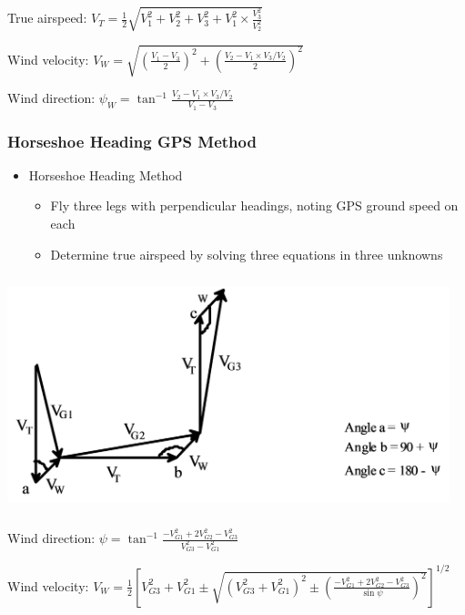 \documentclass[
]{book}
\providecommand{\tightlist}{%
  \setlength{\itemsep}{0pt}\setlength{\parskip}{0pt}}
\begin{document}
True airspeed: \(V_T = \frac{1}{2} \sqrt{V_1^2 + V_2^2 + V_3^2 + V_1^2 \times \frac{V_3^2}{V_2^2}}\)

Wind velocity: \(V_W = \sqrt{\left( \frac{V_1 - V_3}{2} \right)^2 + \left( \frac{V_2 - V_1 \times V_3 / V_2}{2} \right) ^2 }\)

Wind direction: \(\psi_W = \tan^{-1} \frac{V_2 - V_1 \times V_3 / V_2}{V_1 - V_3}\)

\hypertarget{horseshoe-heading-gps-method}{%
\subsubsection*{Horseshoe Heading GPS Method}\label{horseshoe-heading-gps-method}}

\begin{itemize}
\tightlist
\item
  Horseshoe Heading Method

  \begin{itemize}
  \tightlist
  \item
    Fly three legs with perpendicular headings, noting GPS ground speed on each
  \item
    Determine true airspeed by solving three equations in three unknowns
  \end{itemize}
\end{itemize}

\includegraphics[width=5.0625in,height=2.6875in]{media/04/image31.svg}

Wind direction: \(\psi = \tan^{-1} \frac{-V_{G1}^2 + 2V_{G2}^2 - V_{G3}^2}{V_{G3}^2 - V_{G1}^2}\)

Wind velocity: \(V_W = \frac{1}{2} \left[ V_{G3}^2 + V_{G1}^2 \pm \sqrt{ \left(V_{G3}^2 + V_{G1}^2 \right)^2 \pm \left( \frac{-V_{G1}^2 + 2V_{G2}^2 - V_{G3}^2}{\sin{\psi}} \right)^2 } \right]^{1/2}\)
\end{document}
